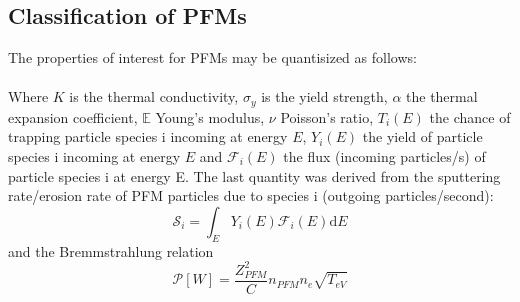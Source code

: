 \documentclass{article}
\begin{document}
\subsection{Classification of PFMs}
The properties of interest for PFMs may be quantisized as follows:
\vspace{0.3cm}\\
\noindent{}
\vspace{0.3cm}\\
Where $K$ is the thermal conductivity, $\sigma_y$ is the yield strength,
$\alpha$ the thermal expansion coefficient, $\mathbb{E}$ Young's modulus, $\nu$
Poisson's ratio, $T_i(E)$ the chance of trapping particle species i incoming at energy 
$E$, $Y_i(E)$ the yield of particle species i incoming at energy
$E$ and $\mathcal{F}_i(E)$ the flux (incoming particles/s) of particle species i at energy E.  
The last quantity  was derived from the sputtering rate/erosion rate of
PFM particles due to species i (outgoing particles/second):
\begin{equation}
    \mathcal{S}_i = \int_E Y_i(E)\mathcal{F}_i(E)\text{d}E 
\end{equation}
and the Bremmstrahlung relation
\begin{equation}
    \mathcal{P}[W] = \frac{Z_{PFM}^2}{C} n_{PFM} n_e\sqrt{T_{eV}}
\end{equation}
\end{document}
